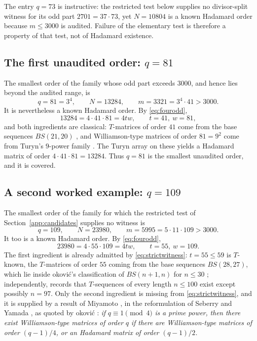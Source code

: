 \documentclass[11pt]{article}
\begin{document}
\noindent
The entry \(q=73\) is instructive: the restricted test below supplies no
divisor-split witness for its odd part \(2701=37\cdot73\), yet
\(N=10804\) is a known Hadamard order because \(m\le3000\) is audited.
Failure of the elementary test is therefore a property of that test, not
of Hadamard existence.

\subsection{The first unaudited order: \texorpdfstring{\(q=81\)}{q=81}}
\label{app:81}

The smallest order of the family whose odd part exceeds \(3000\), and
hence lies beyond the audited range, is
\[
        q=81=3^{4},\qquad N=13284,\qquad m=3321=3^{4}\cdot41>3000 .
\]
It is nevertheless a known Hadamard order.  By \eqref{eq:fourodd},
\[
        13284 = 4\cdot 41\cdot 81 = 4tw,\qquad t=41,\ w=81,
\]
and both ingredients are classical: \(T\)-matrices of order \(41\) come
from the base sequences \(BS(21,20)\) \cite{Turyn1974,
KharaghaniTayfehRezaie2005}, and Williamson-type matrices of order
\(81=9^{2}\) come from Turyn's \(9\)-power family
\cite{Turyn1974,SeberryYamada1992}.  The Turyn array on these
\cite{SeberryYamada1992,SeberryYamada2020} yields a Hadamard matrix of
order \(4\cdot41\cdot81=13284\).  Thus \(q=81\) is the smallest unaudited
order, and it is covered.

\subsection{A second worked example: \texorpdfstring{\(q=109\)}{q=109}}
\label{app:109}

The smallest order of the family for which the restricted test of
Section~\ref{app:candidates} supplies no witness is
\[
        q=109,\qquad N=23980,\qquad m=5995=5\cdot11\cdot109>3000 .
\]
It too is a known Hadamard order.  By \eqref{eq:fourodd},
\[
        23980 = 4\cdot 55\cdot 109 = 4tw,\qquad t=55,\ w=109 .
\]
The first ingredient is already admitted by \eqref{eq:strictwitness}:
\(t=55\le59\) is \(T\)-known, the \(T\)-matrices of order \(55\) coming
from the base sequences \(BS(28,27)\), which lie inside \DJ okovi\'c's
classification of \(BS(n+1,n)\) for \(n\le30\) \cite{Djokovic2010BS};
independently, \cite[Sec.~2]{Djokovic2011} records that \(T\)-sequences of
every length \(n\le100\) exist except possibly \(n=97\).  Only the
second ingredient is missing from \eqref{eq:strictwitness}, and it is
supplied by a result of Miyamoto \cite{Miyamoto1991}, in the
reformulation of Seberry and Yamada
\cite[Cor.~8.8, part~1]{SeberryYamada1992}, as quoted by
\DJ okovi\'c \cite[Thm.~2.5]{Djokovic2011}:
\emph{if \(q\equiv1\pmod4\) is a prime power, then there exist
Williamson-type matrices of order \(q\) if there are Williamson-type
matrices of order \((q-1)/4\), or an Hadamard matrix of order
\((q-1)/2\).}
\end{document}

